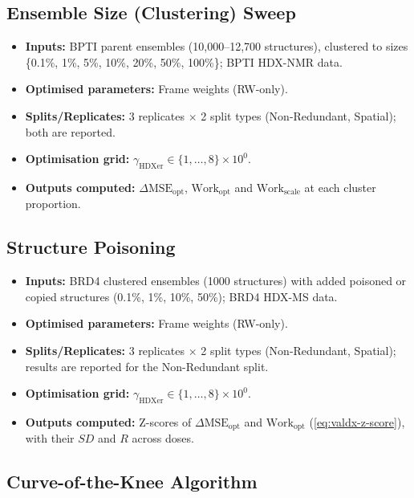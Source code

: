 \subsection{Ensemble Size (Clustering) Sweep}
\label{app:valdx-case-clustering}
\begin{itemize}
    \item \textbf{Inputs:} BPTI parent ensembles (10,000--12,700 structures), clustered to sizes \{0.1\%, 1\%, 5\%, 10\%, 20\%, 50\%, 100\%\}; BPTI HDX-NMR data.
    \item \textbf{Optimised parameters:} Frame weights (RW-only).
    \item \textbf{Splits/Replicates:} 3 replicates $\times$ 2 split types (Non-Redundant, Spatial); both are reported.
    \item \textbf{Optimisation grid:} $\gamma_\text{HDXer} \in \{1, \dots, 8\} \times 10^{0}$.
    \item \textbf{Outputs computed:} $\Delta\text{MSE}_\text{opt}$, $\text{Work}_\text{opt}$ and $\text{Work}_\text{scale}$ at each cluster proportion.
\end{itemize}

\subsection{Structure Poisoning}
\label{app:valdx-case-poisoning}
\begin{itemize}
    \item \textbf{Inputs:} BRD4 clustered ensembles (1000 structures) with added poisoned or copied structures (0.1\%, 1\%, 10\%, 50\%); BRD4 HDX-MS data.
    \item \textbf{Optimised parameters:} Frame weights (RW-only).
    \item \textbf{Splits/Replicates:} 3 replicates $\times$ 2 split types (Non-Redundant, Spatial); results are reported for the Non-Redundant split.
    \item \textbf{Optimisation grid:} $\gamma_\text{HDXer} \in \{1, \dots, 8\} \times 10^{0}$.
    \item \textbf{Outputs computed:} Z-scores of $\Delta\text{MSE}_\text{opt}$ and $\text{Work}_\text{opt}$ (\cref{eq:valdx-z-score}), with their $SD$ and $R$ across doses.
\end{itemize}

\endgroup

\subsection{Curve-of-the-Knee Algorithm}
\label{app:valdx-knee}

